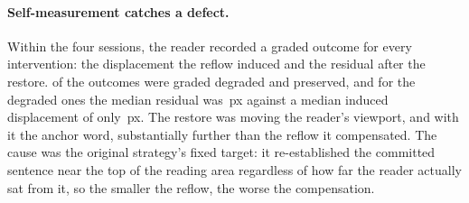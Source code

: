 \paragraph{Self-measurement catches a defect.}
Within the four \on{} sessions, the reader recorded a graded outcome for every intervention: the displacement the reflow induced and the residual after the restore.
\cpDegraded{} of the \interventionsWith{} outcomes were graded degraded and \cpPreserved{} preserved, and for the degraded ones the median residual was \cpDegradedResidualMedian{}\,px against a median induced displacement of only \cpDegradedInducedMedian{}\,px.
The restore was moving the reader's viewport, and with it the anchor word, substantially further than the reflow it compensated.
The cause was the original strategy's fixed target: it re-established the committed sentence near the top of the reading area regardless of how far the reader actually sat from it, so the smaller the reflow, the worse the compensation.

